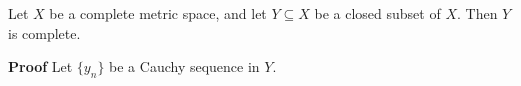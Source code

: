 \documentclass[12pt]{article}
\begin{document}
Let $X$ be a complete metric space, and let $Y \subseteq X$ be a closed subset of $X$. Then $Y$ is complete.

{\bf Proof}
Let $\{ y_n \}$ be a Cauchy sequence in $Y$.
\end{document}
